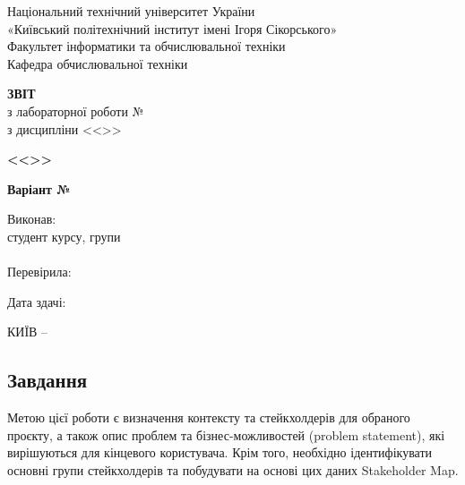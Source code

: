 \documentclass[14pt, a4paper]{extreport}
\begin{document}
	
	\begin{titlepage}
		\begin{center}
			\normalsize
			Національний технічний університет України\\
			«Київський політехнічний інститут імені Ігоря Сікорського» \\[0.5em]
			Факультет інформатики та обчислювальної техніки\\
			Кафедра обчислювальної техніки
			
			\vfill
			
			{\large \textbf{ЗВІТ}\\[0.5em]}
			{з лабораторної роботи №\LabNumber \\}
			{з дисципліни <<\CourseTitle>>}
			
			\vspace{2em}
			
			{\textbf{<<\Topic>>}}
			
			\vspace{1em}
			
			{\textbf{Варіант №\Variant}}
			
			\vfill
			
			\begin{flushright}
				Виконав: \\ студент \CourseNumber{} курсу, групи \StudentGroup \\
				\StudentName \\[1em]
				Перевірила: \\ \Teacher
			\end{flushright}
			
			\vfill
			
			\begin{flushright}
				Дата здачі: \DTMtoday
			\end{flushright}
			
			\vspace{5em}
			КИЇВ -- \ReportYear
		\end{center}
	\end{titlepage}
	
	\clearpage
	\setcounter{page}{2}
	
	\subsection*{Завдання}
	
	Метою цієї роботи є визначення контексту та стейкхолдерів для обраного проєкту, а також опис проблем та бізнес-можливостей (problem statement), які вирішуються для кінцевого користувача. Крім того, необхідно ідентифікувати основні групи стейкхолдерів та побудувати на основі цих даних Stakeholder Map.
	
\end{document}
